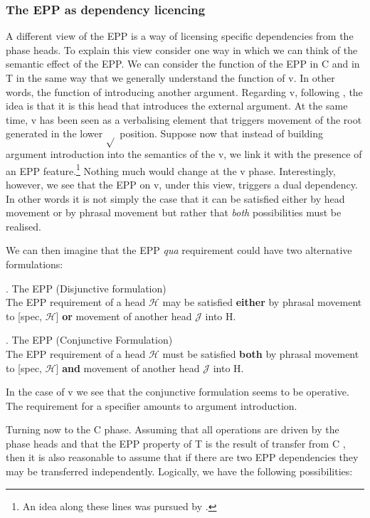 \documentclass[11pt]{article}
\begin{document}
\subsubsection{The EPP as dependency licencing}

A different view of the EPP is a way of licensing specific dependencies from the phase heads.  To explain this view consider  one way in which we can think of the semantic effect of the  EPP. We can consider the function of the  EPP  in C and in T in the same way that we generally understand the function of v.  In other words, the function of introducing another argument.  Regarding v, following \citet{kratzer:96}, the idea is that it is this head that introduces the external argument.  At the same time, v has been seen as a verbalising element that triggers movement of the root generated in the lower $\sqrt{}$ position.  Suppose now that instead of building argument introduction into the semantics of the v, we link it with the presence of an EPP feature.\footnote{An idea along these lines was pursued by \citet{butler:04}.}  Nothing much would change at the v phase.  Interestingly, however, we see that the EPP on v, under this view, triggers a dual dependency.  In other words it is not simply the case that it can be satisfied either by head movement or by phrasal movement but rather that \textit{both} possibilities must be realised.

We can then imagine that the EPP \textit{qua} requirement could have two alternative formulations:

\ex.
The EPP (Disjunctive formulation)\\
The EPP requirement of a head $\mathcal{H}$ may be satisfied \textbf{either} by phrasal movement to [spec, $\mathcal{H}$] \textbf{or} movement of another head $\mathcal{J}$  into {\cal H}.


\ex.  The EPP (Conjunctive Formulation)\\
The EPP requirement of a head $\mathcal{H}$ must be satisfied \textbf{both} by phrasal movement to [spec, $\mathcal{H}$] \textbf{and} movement of another head $\mathcal{J}$ into {\cal H}.

In the case of v we see that the conjunctive formulation seems to be operative. The requirement for a specifier amounts to argument introduction.

Turning now to the C phase.  Assuming that all operations are driven by the phase heads and that the EPP property of T is the result of transfer from C \citep{chomsky:08}, then it is also reasonable to assume that if there are two EPP dependencies they may be transferred independently.  Logically, we have the following possibilities:
\end{document}
